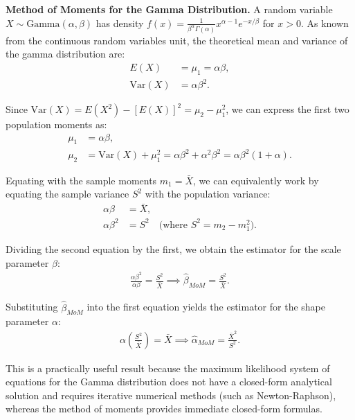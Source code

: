 \begin{ejemplo}
	\textbf{Method of Moments for the Gamma Distribution.}
	A random variable $X \sim \text{Gamma}(\alpha, \beta)$ has density $f(x) = \frac{1}{\beta^\alpha \Gamma(\alpha)} x^{\alpha-1} e^{-x/\beta}$ for $x > 0$. As known from the continuous random variables unit, the theoretical mean and variance of the gamma distribution are:
	\begin{align}
		E(X) &= \mu_1 = \alpha\beta, \\
		\text{Var}(X) &= \alpha\beta^2.
	\end{align}

	Since $\text{Var}(X) = E(X^2) - [E(X)]^2 = \mu_2 - \mu_1^2$, we can express the first two population moments as:
	\begin{align}
		\mu_1 &= \alpha\beta, \\
		\mu_2 &= \text{Var}(X) + \mu_1^2 = \alpha\beta^2 + \alpha^2\beta^2 = \alpha\beta^2(1 + \alpha).
	\end{align}

	Equating with the sample moments $m_1 = \bar{X}$, we can equivalently work by equating the sample variance $S^2$ with the population variance:
	\begin{align}
		\alpha\beta &= \bar{X}, \\
		\alpha\beta^2 &= S^2 \quad \text{(where } S^2 = m_2 - m_1^2 \text{)}.
	\end{align}

	Dividing the second equation by the first, we obtain the estimator for the scale parameter $\beta$:
	\begin{align}
		\frac{\alpha\beta^2}{\alpha\beta} = \frac{S^2}{\bar{X}} \implies \hat{\beta}_{MoM} = \frac{S^2}{\bar{X}}.
	\end{align}

	Substituting $\hat{\beta}_{MoM}$ into the first equation yields the estimator for the shape parameter $\alpha$:
	\begin{align}
		\alpha \left( \frac{S^2}{\bar{X}} \right) = \bar{X} \implies \hat{\alpha}_{MoM} = \frac{\bar{X}^2}{S^2}.
	\end{align}

	This is a practically useful result because the maximum likelihood system of equations for the Gamma distribution does not have a closed-form analytical solution and requires iterative numerical methods (such as Newton-Raphson), whereas the method of moments provides immediate closed-form formulas.
\end{ejemplo}

